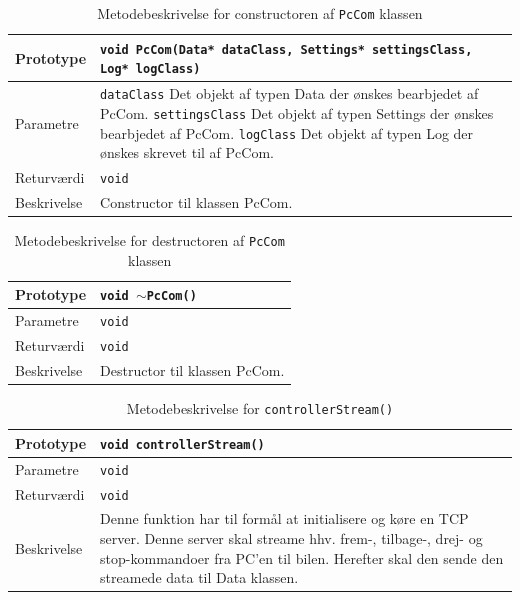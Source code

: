 \begin{table}[h]
\begin{tabularx}{\textwidth}{| L{2.5 cm} | Z |} \hline
Prototype 	& \texttt{void PcCom(Data* dataClass, Settings* settingsClass, Log* logClass)} \\\hline
Parametre 	& \texttt{dataClass} 		\newline Det objekt af typen Data der ønskes bearbjedet af PcCom. \newline \newline
			  \texttt{settingsClass} 	\newline Det objekt af typen Settings der ønskes bearbjedet af PcCom. \newline \newline
			  \texttt{logClass}	 		\newline Det objekt af typen Log der ønskes skrevet til af PcCom. \\\hline
Returværdi	& \texttt{void} 			\newline \\\hline
Beskrivelse	& Constructor til klassen PcCom. \newline \\\hline
\end{tabularx}
\caption{Metodebeskrivelse for constructoren af \texttt{PcCom} klassen}
\label{table:met_pccom}
\end{table}

\begin{table}[h]
\begin{tabularx}{\textwidth}{| L{2.5 cm} | Z |} \hline
Prototype 	& \texttt{void $\sim$PcCom()} \\\hline
Parametre 	& \texttt{void}				\newline \\\hline
Returværdi	& \texttt{void} 			\newline \\\hline
Beskrivelse	& Destructor til klassen PcCom. \newline \\\hline
\end{tabularx}
\caption{Metodebeskrivelse for destructoren af \texttt{PcCom} klassen}
\label{table:met_pccom_de}
\end{table}

\begin{table}[h]
\begin{tabularx}{\textwidth}{| L{2.5 cm} | Z |} \hline
Prototype 	& \texttt{void controllerStream()} \\\hline
Parametre 	& \texttt{void}				\newline \\\hline
Returværdi	& \texttt{void} 			\newline \\\hline
Beskrivelse	& Denne funktion har til formål at initialisere og køre en TCP server. Denne server skal streame hhv. frem-, tilbage-, drej- og stop-kommandoer fra PC'en til bilen. Herefter skal den sende den streamede data til Data klassen. \\\hline
\end{tabularx}
\caption{Metodebeskrivelse for \texttt{controllerStream()}}
\label{table:met_controllerstream}
\end{table}

